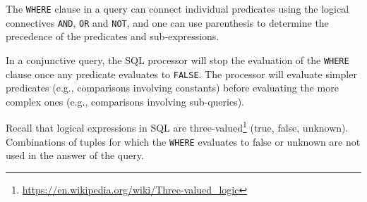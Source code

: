 \documentclass[xcolor={usenames,dvipsnames}]{beamer}
\begin{document}

\begin{frame}[fragile]

The \lstinline[style=SQL]{WHERE} clause in a query can connect individual predicates using the logical connectives \lstinline[style=SQL]{AND}, \lstinline[style=SQL]{OR} and \lstinline[style=SQL]{NOT}, and one can use parenthesis to determine the precedence of the predicates and sub-expressions.

In a conjunctive query, the SQL processor will stop the evaluation of the \lstinline[style=SQL]{WHERE} clause once any predicate evaluates to \lstinline[style=SQL]{FALSE}. The processor will evaluate simpler predicates (e.g., comparisons involving constants) before evaluating the more complex ones (e.g., comparisons involving sub-queries).

Recall that logical expressions in SQL are three-valued\footnote{\url{https://en.wikipedia.org/wiki/Three-valued_logic}} (true, false, unknown). Combinations of tuples for which the \lstinline[style=SQL]{WHERE} evaluates to false or unknown are not used in the answer of the query.
\end{frame}
\end{document}
